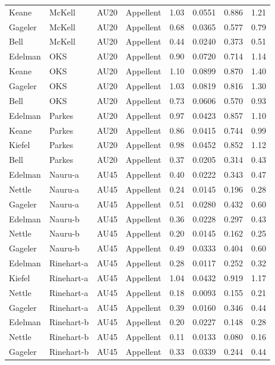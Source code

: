 \documentclass{monashthesis}
\begin{document}
\begin{center}
\begin{longtable}{llllllll}
Keane & McKell & AU20 & Appellent & 1.03 & 0.0551 & 0.886 & 1.21 \\
Gageler & McKell & AU20 & Appellent & 0.68 & 0.0365 & 0.577 & 0.79 \\
Bell & McKell & AU20 & Appellent & 0.44 & 0.0240 & 0.373 & 0.51 \\
Edelman & OKS & AU20 & Appellent & 0.90 & 0.0720 & 0.714 & 1.14 \\
Keane & OKS & AU20 & Appellent & 1.10 & 0.0899 & 0.870 & 1.40 \\
Gageler & OKS & AU20 & Appellent & 1.03 & 0.0819 & 0.816 & 1.30 \\
Bell & OKS & AU20 & Appellent & 0.73 & 0.0606 & 0.570 & 0.93 \\
Edelman & Parkes & AU20 & Appellent & 0.97 & 0.0423 & 0.857 & 1.10 \\
Keane & Parkes & AU20 & Appellent & 0.86 & 0.0415 & 0.744 & 0.99 \\
Kiefel & Parkes & AU20 & Appellent & 0.98 & 0.0452 & 0.852 & 1.12 \\
Bell & Parkes & AU20 & Appellent & 0.37 & 0.0205 & 0.314 & 0.43 \\
Edelman & Nauru-a & AU45 & Appellent & 0.40 & 0.0222 & 0.343 & 0.47 \\
Nettle & Nauru-a & AU45 & Appellent & 0.24 & 0.0145 & 0.196 & 0.28 \\
Gageler & Nauru-a & AU45 & Appellent & 0.51 & 0.0280 & 0.432 & 0.60 \\
Edelman & Nauru-b & AU45 & Appellent & 0.36 & 0.0228 & 0.297 & 0.43 \\
Nettle & Nauru-b & AU45 & Appellent & 0.20 & 0.0145 & 0.162 & 0.25 \\
Gageler & Nauru-b & AU45 & Appellent & 0.49 & 0.0333 & 0.404 & 0.60 \\
Edelman & Rinehart-a & AU45 & Appellent & 0.28 & 0.0117 & 0.252 & 0.32 \\
Kiefel & Rinehart-a & AU45 & Appellent & 1.04 & 0.0432 & 0.919 & 1.17 \\
Nettle & Rinehart-a & AU45 & Appellent & 0.18 & 0.0093 & 0.155 & 0.21 \\
Gageler & Rinehart-a & AU45 & Appellent & 0.39 & 0.0160 & 0.346 & 0.44 \\
Edelman & Rinehart-b & AU45 & Appellent & 0.20 & 0.0227 & 0.148 & 0.28 \\
Nettle & Rinehart-b & AU45 & Appellent & 0.11 & 0.0133 & 0.080 & 0.16 \\
Gageler & Rinehart-b & AU45 & Appellent & 0.33 & 0.0339 & 0.244 & 0.44 \\

\end{longtable}
\end{center}
\end{document}
